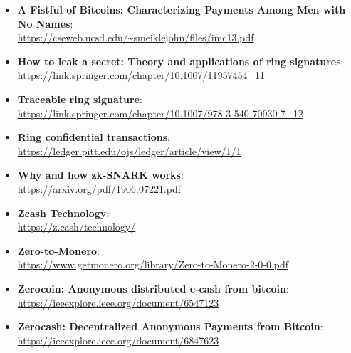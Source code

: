 \begin{itemize}
\tightlist
\item
  \textbf{A Fistful of Bitcoins: Characterizing Payments Among Men with
  No Names}: \\
\url{https://cseweb.ucsd.edu/~smeiklejohn/files/imc13.pdf}

\item
  \textbf{How to leak a secret: Theory and applications of ring
  signatures}: \\
  \url{https://link.springer.com/chapter/10.1007/11957454_11}
\item
  \textbf{Traceable ring signature}:\\
  \url{https://link.springer.com/chapter/10.1007/978-3-540-70930-7_12}
\item
  \textbf{Ring confidential transactions}:\\
  \url{https://ledger.pitt.edu/ojs/ledger/article/view/1/1}
\item
  \textbf{Why and how zk-SNARK works}:\\
  \url{https://arxiv.org/pdf/1906.07221.pdf}
\item
  \textbf{Zcash Technology}:\\ \url{https://z.cash/technology/}
\item
  \textbf{Zero-to-Monero}:\\
  \url{https://www.getmonero.org/library/Zero-to-Monero-2-0-0.pdf}
\item
  \textbf{Zerocoin: Anonymous distributed e-cash from bitcoin}:\\
  \url{https://ieeexplore.ieee.org/document/6547123}
\item
  \textbf{Zerocash: Decentralized Anonymous Payments from Bitcoin}:\\
  \url{https://ieeexplore.ieee.org/document/6847623}
\end{itemize}
